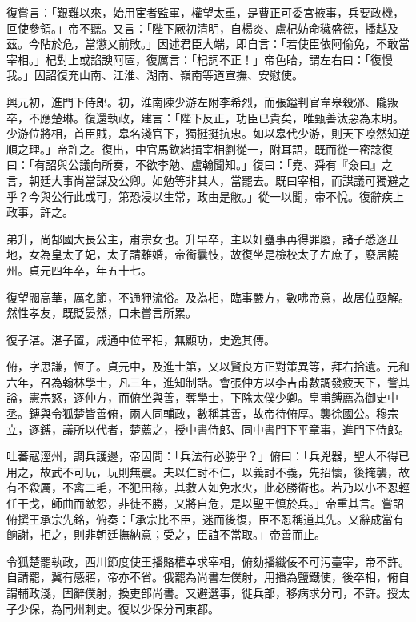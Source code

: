 \begin{pinyinscope}
 復嘗言：「艱難以來，始用宦者監軍，權望太重，是曹正可委宮掖事，兵要政機，叵使參領。」帝不聽。又言：「陛下厥初清明，自楊炎、盧杞妨命穢盛德，播越及茲。今阽於危，當懲乂前敗。」因述君臣大端，即自言：「若使臣依阿偷免，不敢當宰相。」杞對上或諂諛阿匼，復厲言：「杞詞不正！」帝色眙，謂左右曰：「復慢我。」因詔復充山南、江淮、湖南、嶺南等道宣撫、安慰使。



 興元初，進門下侍郎。初，淮南陳少游左附李希烈，而張鎰判官韋皋殺邠、隴叛卒，不應楚琳。復還執政，建言：「陛下反正，功臣已貴矣，唯甄善汰惡為未明。少游位將相，首臣賊，皋名淺官下，獨挺挺抗忠。如以皋代少游，則天下嘹然知逆順之理。」帝許之。復出，中官馬欽緒揖宰相劉從一，附耳語，既而從一密諗復曰：「有詔與公議向所奏，不欲李勉、盧翰聞知。」復曰：「堯、舜有『僉曰』之言，朝廷大事尚當謀及公卿。如勉等非其人，當罷去。既曰宰相，而謀議可獨避之乎？今與公行此或可，第恐浸以生常，政由是敝。」從一以聞，帝不悅。復辭疾上政事，許之。



 弟升，尚郜國大長公主，肅宗女也。升早卒，主以奸蠱事再得罪廢，諸子悉逐丑地，女為皇太子妃，太子請離婚，帝銜曩忮，故復坐是檢校太子左庶子，廢居饒州。貞元四年卒，年五十七。



 復望閥高華，厲名節，不通狎流俗。及為相，臨事嚴方，數咈帝意，故居位亟解。然性孝友，既貶晏然，口未嘗言所累。



 復子湛。湛子置，咸通中位宰相，無顯功，史逸其傳。



 俯，字思謙，恆子。貞元中，及進士第，又以賢良方正對策異等，拜右拾遺。元和六年，召為翰林學士，凡三年，進知制誥。會張仲方以李吉甫數調發疲天下，訾其謚，憲宗怒，逐仲方，而俯坐與善，奪學士，下除太僕少卿。皇甫鎛薦為御史中丞。鎛與令狐楚皆善俯，兩人同輔政，數稱其善，故帝待俯厚。襲徐國公。穆宗立，逐鎛，議所以代者，楚薦之，授中書侍郎、同中書門下平章事，進門下侍郎。



 吐蕃寇涇州，調兵護邊，帝因問：「兵法有必勝乎？」俯曰：「兵兇器，聖人不得已用之，故武不可玩，玩則無震。夫以仁討不仁，以義討不義，先招懷，後掩襲，故有不殺厲，不禽二毛，不犯田稼，其救人如免水火，此必勝術也。若乃以小不忍輕任干戈，師曲而敵怨，非徒不勝，又將自危，是以聖王慎於兵。」帝重其言。嘗詔俯撰王承宗先銘，俯奏：「承宗比不臣，迷而後復，臣不忍稱道其先。又辭成當有餉謝，拒之，則非朝廷撫納意；受之，臣誼不當取。」帝善而止。



 令狐楚罷執政，西川節度使王播賂權幸求宰相，俯劾播纖佞不可污臺宰，帝不許。自請罷，冀有感寤，帝亦不省。俄罷為尚書左僕射，用播為鹽鐵使，後卒相，俯自謂輔政淺，固辭僕射，換吏部尚書。又避選事，徙兵部，移病求分司，不許。授太子少保，為同州刺史。復以少保分司東都。




\end{pinyinscope}
